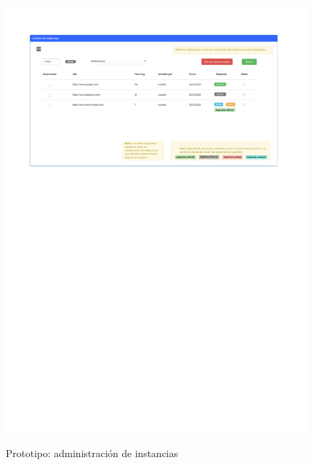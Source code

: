 \begin{figure}[h]
	\caption{Prototipo: administración de instancias}
	\centering
	\includegraphics[width=\textwidth]{../img/anexos/mockups/9-mockups-instances}
	\label{mock:instance-admin}
\end{figure}

